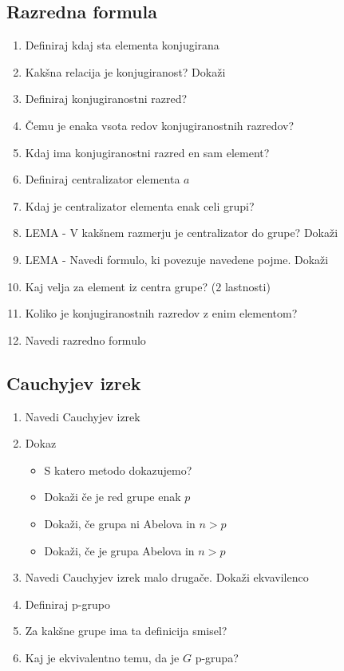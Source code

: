 \documentclass{article}
\begin{document}
    \subsection{Razredna formula}
    \begin{enumerate}
        \item Definiraj kdaj sta elementa konjugirana
        \item Kakšna relacija je konjugiranost? Dokaži
        \item Definiraj konjugiranostni razred?
        \item Čemu je enaka vsota redov konjugiranostnih razredov?
        \item Kdaj ima konjugiranostni razred en sam element?
        \item Definiraj centralizator elementa $a$
        \item Kdaj je centralizator elementa enak celi grupi?
        \item LEMA - V kakšnem razmerju je centralizator do grupe? Dokaži
        \item LEMA - Navedi formulo, ki povezuje navedene pojme. Dokaži
        \item Kaj velja za element iz centra grupe? (2 lastnosti)
        \item Koliko je konjugiranostnih razredov z enim elementom?
        \item Navedi razredno formulo
    \end{enumerate}

    \subsection{Cauchyjev izrek}
    \begin{enumerate}
        \item Navedi Cauchyjev izrek
        \item Dokaz
        \begin{itemize}
            \item S katero metodo dokazujemo?
            \item Dokaži če je red grupe enak $p$
            \item Dokaži, če grupa ni Abelova in $n > p$
            \item Dokaži, če je grupa Abelova in $n > p$
        \end{itemize}
        \item Navedi Cauchyjev izrek malo drugače. Dokaži ekvavilenco
        \item Definiraj p-grupo
        \item Za kakšne grupe ima ta definicija smisel?
        \item Kaj je ekvivalentno temu, da je $G$ p-grupa?
    \end{enumerate}
\end{document}
